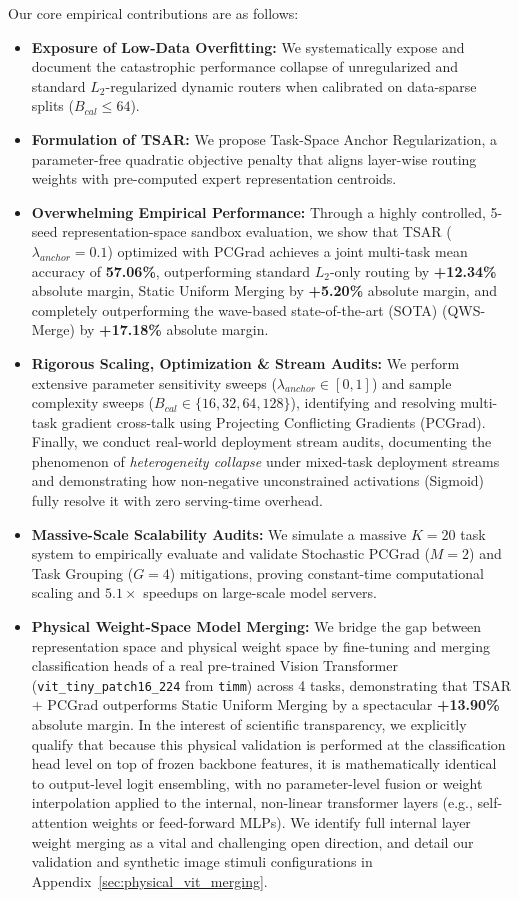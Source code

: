 Our core empirical contributions are as follows:
\begin{itemize}
  \item \textbf{Exposure of Low-Data Overfitting:} We systematically expose and document the
catastrophic performance collapse of unregularized and standard $L_2$-regularized dynamic routers
when calibrated on data-sparse splits ($B_{cal} \le 64$).
  \item \textbf{Formulation of TSAR:} We propose Task-Space Anchor Regularization, a parameter-free
quadratic objective penalty that aligns layer-wise routing weights with pre-computed expert
representation centroids.
  \item \textbf{Overwhelming Empirical Performance:} Through a highly controlled, 5-seed
representation-space sandbox evaluation, we show that TSAR ($\lambda_{anchor}=0.1$) optimized with
PCGrad achieves a joint multi-task mean accuracy of \textbf{57.06\%}, outperforming standard
$L_2$-only routing by \textbf{+12.34\%} absolute margin, Static Uniform Merging by \textbf{+5.20\%}
absolute margin, and completely outperforming the wave-based state-of-the-art (SOTA) (QWS-Merge) by
\textbf{+17.18\%} absolute margin.
  \item \textbf{Rigorous Scaling, Optimization \& Stream Audits:} We perform extensive parameter
sensitivity sweeps ($\lambda_{anchor} \in [0, 1]$) and sample complexity sweeps ($B_{cal} \in \{16,
32, 64, 128\}$), identifying and resolving multi-task gradient cross-talk using Projecting
Conflicting Gradients (PCGrad). Finally, we conduct real-world deployment stream audits, documenting
the phenomenon of \emph{heterogeneity collapse} under mixed-task deployment streams and
demonstrating how non-negative unconstrained activations (Sigmoid) fully resolve it with zero
serving-time overhead.
  \item \textbf{Massive-Scale Scalability Audits:} We simulate a massive $K=20$ task system to
empirically evaluate and validate Stochastic PCGrad ($M=2$) and Task Grouping ($G=4$) mitigations,
proving constant-time computational scaling and $5.1\times$ speedups on large-scale model servers.
  \item \textbf{Physical Weight-Space Model Merging:} We bridge the gap between representation
space and physical weight space by fine-tuning and merging classification heads of a real
pre-trained Vision Transformer (\texttt{vit\_tiny\_patch16\_224} from \texttt{timm}) across 4 tasks,
demonstrating that TSAR + PCGrad outperforms Static Uniform Merging by a spectacular
\textbf{+13.90\%} absolute margin. In the interest of scientific transparency, we explicitly qualify
that because this physical validation is performed at the classification head level on top of
frozen backbone features, it is mathematically identical to output-level logit ensembling, with
no parameter-level fusion or weight interpolation applied to the internal, non-linear transformer
layers (e.g., self-attention weights or feed-forward MLPs). We identify full internal layer weight
merging as a vital and challenging open direction, and detail our validation and synthetic image stimuli
configurations in Appendix~\ref{sec:physical_vit_merging}.
\end{itemize}